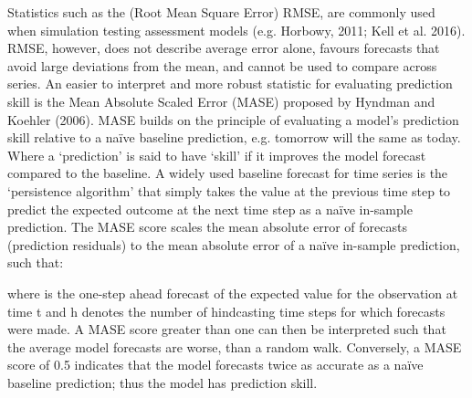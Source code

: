 Statistics such as the (Root Mean Square Error) RMSE, are commonly used when simulation testing assessment models (e.g. Horbowy, 2011; Kell et al. 2016). RMSE, however, does not describe average error alone, favours forecasts that avoid large deviations from the mean, and cannot be used to compare across series. An easier to interpret and more robust statistic for evaluating prediction skill is the Mean Absolute Scaled Error (MASE) proposed by Hyndman and Koehler (2006). MASE builds on the principle of evaluating a model’s prediction skill relative to a naïve baseline prediction, e.g. tomorrow will the same as today. Where a ‘prediction’ is said to have ‘skill’ if it improves the model forecast compared to the baseline. A widely used baseline forecast for time series is the ‘persistence algorithm’ that simply takes the value at the previous time step to predict the expected outcome at the next time step as a naïve in-sample prediction. The MASE score scales the mean absolute error of forecasts (prediction residuals) to the mean absolute error of a naïve in-sample prediction, such that:

where  is the one-step ahead forecast of the expected value for the observation at time t and h denotes the number of hindcasting time steps for which forecasts   were made. A MASE score greater than one can then be interpreted such that the average model forecasts are worse, than a random walk. Conversely, a MASE score of 0.5 indicates that the model forecasts twice as accurate as a naïve baseline prediction; thus the model has prediction skill.  

